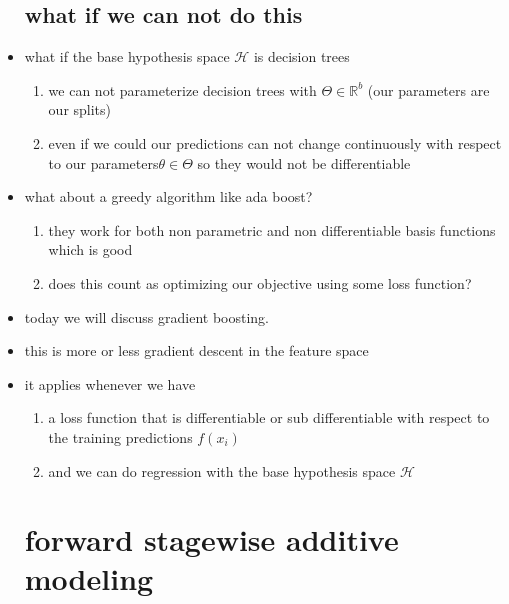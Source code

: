 \documentclass{article}
\begin{document}
\begin{itemize}
\subsection{what if we can not do this}
\item what if the base hypothesis space $\mathcal{H}$ is decision trees
\begin{enumerate}
    \item we can not parameterize decision trees with $\Theta\in \mathbb{R}^{b}$ (our parameters are our splits)
    \item even if we could our predictions can not change continuously with respect to our parameters$\theta\in \Theta$ so they would not be differentiable 
\end{enumerate}
\item what about a greedy algorithm like ada boost?
\begin{enumerate}
    \item they work for both non parametric and non differentiable basis functions which is good
    \item does this count as optimizing our objective using some loss function?
\end{enumerate}
\item today we will discuss gradient boosting. 
\item this is more or less gradient descent in the feature space
\item it applies whenever we have 
\begin{enumerate}
    \item a loss function that is differentiable or sub differentiable with respect to the training predictions $f(x_i)$
    \item and we can do regression with the base hypothesis space $\mathcal{H}$
\end{enumerate}
\section{forward stagewise additive modeling }

\end{itemize}
\end{document}
